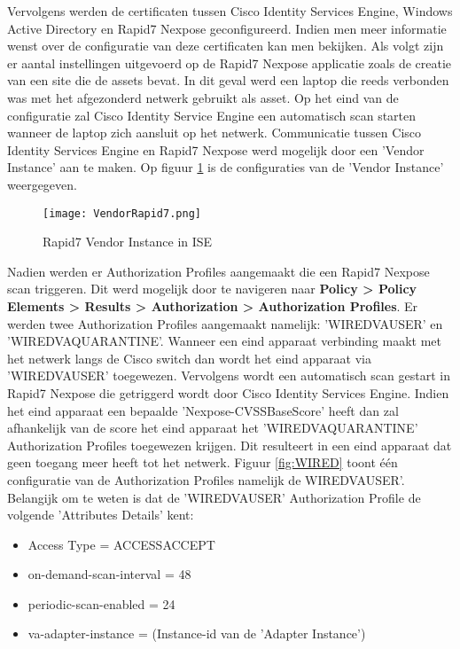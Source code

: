  Vervolgens werden de certificaten tussen Cisco Identity Services Engine, Windows Active Directory en Rapid7 Nexpose geconfigureerd. Indien men meer informatie wenst over de configuratie van deze certificaten kan men \cite{thread_yt} bekijken.
 \newline
 \newline
 Als volgt zijn er aantal instellingen uitgevoerd op de Rapid7 Nexpose applicatie zoals de creatie van een site die de assets bevat. In dit geval werd een laptop die reeds verbonden was met het afgezonderd netwerk gebruikt als asset. Op het eind van de configuratie zal Cisco Identity Service Engine een automatisch scan starten wanneer de laptop zich aansluit op het netwerk. 
 \newline
 \newline
 Communicatie tussen Cisco Identity Services Engine en Rapid7 Nexpose werd mogelijk door een 'Vendor Instance' aan te maken. Op figuur \ref{fig:vendor} is de configuraties van de 'Vendor Instance' weergegeven.
	 \begin{figure}[H]
		 	\centering
		 	\texttt{[image: VendorRapid7.png]}
		 	\caption{Rapid7 Vendor Instance in ISE}%
		 	\label{fig:vendor}%
	 \end{figure}
Nadien werden er Authorization Profiles aangemaakt die een Rapid7 Nexpose scan triggeren. Dit werd mogelijk door te navigeren naar \textbf{ Policy > Policy Elements > Results > Authorization > Authorization Profiles}. Er werden twee Authorization Profiles aangemaakt namelijk: 'WIRED\textunderscore VA\textunderscore USER' en 'WIRED\textunderscore VA\textunderscore QUARANTINE'. 
 \newline
\newline
Wanneer een eind apparaat verbinding maakt met het netwerk langs de Cisco switch dan wordt het eind apparaat via 'WIRED\textunderscore VA\textunderscore USER' toegewezen. Vervolgens wordt een automatisch scan gestart in Rapid7 Nexpose die getriggerd wordt door Cisco Identity Services Engine. 
 \newline
\newline
Indien het eind apparaat een bepaalde 'Nexpose-CVSS\textunderscore Base\textunderscore Score' heeft dan zal afhankelijk van de score het eind apparaat het 'WIRED\textunderscore VA\textunderscore QUARANTINE' Authorization Profiles toegewezen krijgen. Dit resulteert in een eind apparaat dat geen toegang meer heeft tot het netwerk. Figuur \ref{fig:WIRED} toont één configuratie van de Authorization Profiles namelijk de WIRED\textunderscore VA\textunderscore USER'. 
\newline
\newline
Belangijk om te weten is dat de 'WIRED\textunderscore VA\textunderscore USER' Authorization Profile de volgende 'Attributes Details' kent: 
	\begin{itemize}
	\item Access Type = ACCESS\textunderscore ACCEPT
	\item on-demand-scan-interval = 48
	\item periodic-scan-enabled = 24	
	\item va-adapter-instance = (Instance-id van de 'Adapter Instance')
\end{itemize}

